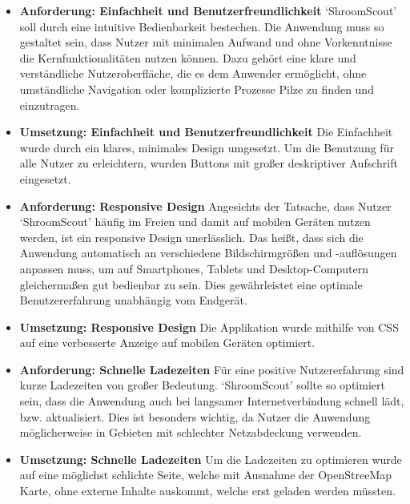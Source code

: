\documentclass[../main.tex]{subfiles}
\begin{document}
\begin{itemize}

	\item \textbf{Anforderung: Einfachheit und Benutzerfreundlichkeit}
	      `ShroomScout' soll durch eine intuitive Bedienbarkeit bestechen. Die Anwendung muss so gestaltet sein, dass Nutzer mit
	      minimalen Aufwand und ohne Vorkenntnisse die Kernfunktionalitäten nutzen können. Dazu gehört eine klare und verständliche
	      Nutzeroberfläche, die es dem Anwender ermöglicht, ohne umständliche Navigation oder komplizierte Prozesse Pilze zu finden
	      und einzutragen.

    \item \textbf{Umsetzung: Einfachheit und Benutzerfreundlichkeit}
          Die Einfachheit wurde durch ein klares, minimales Design umgesetzt. 
          Um die Benutzung für alle Nutzer zu erleichtern, wurden Buttons mit großer deskriptiver Aufschrift eingesetzt.

	\item \textbf{Anforderung: Responsive Design}
	      Angesichts der Tatsache, dass Nutzer `ShroomScout' häufig im Freien und damit auf mobilen Geräten nutzen werden, ist ein
	      responsive Design unerlässlich. Das heißt, dass sich die Anwendung automatisch an verschiedene Bildschirmgrößen und -auflösungen
	      anpassen muss, um auf Smartphones, Tablets und Desktop-Computern gleichermaßen gut bedienbar zu sein. Dies gewährleistet eine
	      optimale Benutzererfahrung unabhängig vom Endgerät.
    
    \item \textbf{Umsetzung: Responsive Design}
          Die Applikation wurde mithilfe von CSS auf eine verbesserte Anzeige auf mobilen Geräten optimiert.
	      
	\item \textbf{Anforderung: Schnelle Ladezeiten}
	      Für eine positive Nutzererfahrung sind kurze Ladezeiten von großer Bedeutung. `ShroomScout' sollte so optimiert sein, dass die
	      Anwendung auch bei langsamer Internetverbindung schnell lädt, bzw. aktualisiert. Dies ist besonders wichtig, da Nutzer die Anwendung
	      möglicherweise in Gebieten mit schlechter Netzabdeckung verwenden.

    \item \textbf{Umsetzung: Schnelle Ladezeiten}
	      Um die Ladezeiten zu optimieren wurde auf eine möglichst schlichte Seite, welche mit Ausnahme der OpenStreeMap Karte, 
          ohne externe Inhalte auskommt, welche erst geladen werden müssten.


\end{itemize}
\end{document}
